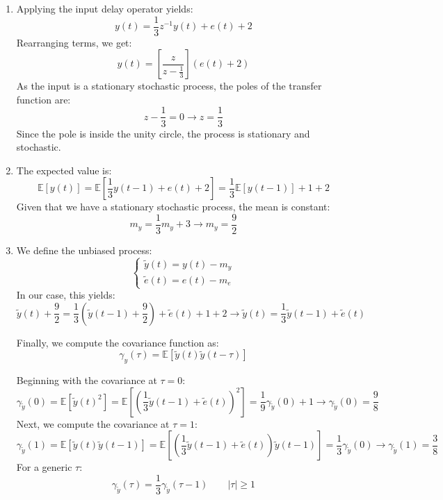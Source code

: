 \begin{enumerate}
    \item Applying the input delay operator yields:
        \[y(t)=\dfrac{1}{3}z^{-1}y(t)+e(t)+2\]
        Rearranging terms, we get:
        \[y(t)=\left[\dfrac{z}{z-\frac{1}{3}}\right]\left(e(t)+2\right)\]
        As the input is a stationary stochastic process, the poles of the transfer function are:
        \[z-\frac{1}{3}=0\rightarrow z=\frac{1}{3}\]
        Since the pole is inside the unity circle, the process is stationary and stochastic.
    \item The expected value is: 
        \[\mathbb{E}\left[y(t)\right]=\mathbb{E}\left[\dfrac{1}{3}y(t-1)+e(t)+2\right]=\dfrac{1}{3}\mathbb{E}\left[y(t-1)\right]+1+2\]
        Given that we have a stationary stochastic process, the mean is constant:
        \[m_y=\dfrac{1}{3}m_y+3\rightarrow m_y=\dfrac{9}{2}\]
    \item We define the unbiased process:
        \[\begin{cases}
            \tilde{y}(t)=y(t)-m_y \\
            \tilde{e}(t)=e(t)-m_e
        \end{cases}\]
        In our case, this yields:
        \[\tilde{y}(t)+\dfrac{9}{2}=\dfrac{1}{3}\left(\tilde{y}(t-1)+\dfrac{9}{2}\right)+\tilde{e}(t)+1+2\rightarrow\tilde{y}(t)=\dfrac{1}{3}\tilde{y}(t-1)+\tilde{e}(t)\]

        Finally, we compute the covariance function as: 
        \[\gamma_y(\tau)=\mathbb{E}\left[\tilde{y}(t)\tilde{y}(t-\tau)\right]\]
        
        Beginning with the covariance at $\tau=0$: 
        \[\gamma_{\tilde{y}}(0)=\mathbb{E}\left[\tilde{y}{(t)}^2\right]=\mathbb{E}\left[ {\left(\dfrac{1}{3}\tilde{y}(t-1)+\tilde{e}(t)\right)}^2\right]=\dfrac{1}{9}\gamma_{\tilde{y}}(0) + 1\rightarrow \gamma_{\tilde{y}}(0)=\dfrac{9}{8}\]
        Next, we compute the covariance at $\tau=1$: 
        \[\gamma_{\tilde{y}}(1)=\mathbb{E}\left[ \tilde{y}(t)\tilde{y}(t-1)\right]=\mathbb{E}\left[ \left(\dfrac{1}{3}\tilde{y}(t-1)+\tilde{e}(t)\right)\tilde{y}(t-1)\right]=\dfrac{1}{3}\gamma_{\tilde{y}}(0)\rightarrow \gamma_{\tilde{y}}(1)=\dfrac{3}{8}\]
        For a generic $\tau$: 
        \[\gamma_{\tilde{y}}(\tau)=\dfrac{1}{3}\gamma_{\tilde{y}}(\tau-1) \qquad \left\lvert \tau \right\rvert \geq 1\]
\end{enumerate}